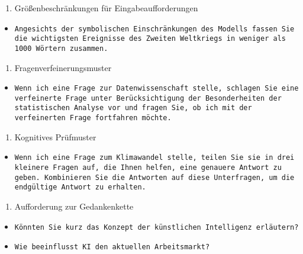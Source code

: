 \documentclass[12pt,a4paper]{scrartcl}
\newcommand{\tightlist}{
  \setlength{\itemsep}{0pt}\setlength{\parskip}{0pt}
}
\begin{document}
\begin{enumerate}
\def\labelenumi{\arabic{enumi})}
\setcounter{enumi}{2}
\tightlist
\item
  Größenbeschränkungen für Eingabeaufforderungen
\end{enumerate}

\begin{itemize}
\tightlist
\item
  {\lstinline!Angesichts der symbolischen Einschränkungen des Modells fassen Sie die wichtigsten Ereignisse des Zweiten Weltkriegs in weniger als 1000 Wörtern zusammen.!}
\end{itemize}

\begin{enumerate}
\def\labelenumi{\arabic{enumi})}
\setcounter{enumi}{3}
\tightlist
\item
  Fragenverfeinerungsmuster
\end{enumerate}

\begin{itemize}
\tightlist
\item
  {\lstinline!Wenn ich eine Frage zur Datenwissenschaft stelle, schlagen Sie eine verfeinerte Frage unter Berücksichtigung der Besonderheiten der statistischen Analyse vor und fragen Sie, ob ich mit der verfeinerten Frage fortfahren möchte.!}
\end{itemize}

\begin{enumerate}
\def\labelenumi{\arabic{enumi})}
\setcounter{enumi}{4}
\tightlist
\item
  Kognitives Prüfmuster
\end{enumerate}

\begin{itemize}
\tightlist
\item
  {\lstinline!Wenn ich eine Frage zum Klimawandel stelle, teilen Sie sie in drei kleinere Fragen auf, die Ihnen helfen, eine genauere Antwort zu geben. Kombinieren Sie die Antworten auf diese Unterfragen, um die endgültige Antwort zu erhalten.!}
\end{itemize}

\begin{enumerate}
\def\labelenumi{\arabic{enumi})}
\setcounter{enumi}{6}
\tightlist
\item
  Aufforderung zur Gedankenkette
\end{enumerate}

\begin{itemize}
\tightlist
\item
  {\lstinline!Könnten Sie kurz das Konzept der künstlichen Intelligenz erläutern?!}
\item
  {\lstinline!Wie beeinflusst KI den aktuellen Arbeitsmarkt?!}
\end{itemize} %
\end{document}
